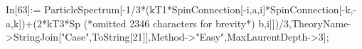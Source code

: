 In[63]:= ParticleSpectrum[-1/3*(kT1*SpinConnection[-i,a,i]*SpinConnection[-k,-a,k])+(2*kT3*Sp (*omitted 2346 characters for brevity*) b,i]])/3,TheoryName->StringJoin["Case",ToString[21]],Method->"Easy",MaxLaurentDepth->3];